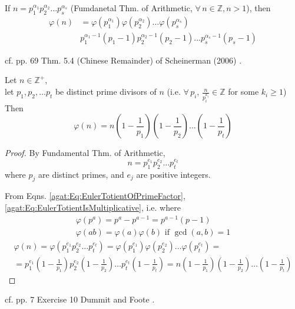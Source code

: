 If $n=p_1^{\alpha_1}p_2^{\alpha_2} \dots p_s^{\alpha_s}$ (Fumdanetal Thm. of Arithmetic, $\forall \, n \in \mathbb{Z}, n>1$), then 
\begin{equation}
\boxed{ 
	\begin{aligned}
	\varphi(n) & = \varphi(p_1^{\alpha_1})  \varphi(p_2^{\alpha_2}) \dots \varphi(p_s^{\alpha_s}) \\ 
	& p_1^{\alpha_1 - 1 } (p_1 - 1) p_2^{\alpha_2 - 1} (p_2 - 1 ) \dots p_s^{\alpha_s -1} (p_s - 1) 
	\end{aligned} }
\end{equation}


cf. pp. 69 Thm. 5.4 (Chinese Remainder) of Scheinerman (2006) \cite{agat:Sche2006}.  
\begin{theorem}
	Let $n\in \mathbb{Z}^+$, \\
	let $p_1,p_2, \dots p_t$ be distinct prime divisors of $n$ (i.e. $\forall \, p_i$, $\frac{n}{p_i^{k_i}} \in \mathbb{Z}$ for some $k_i \geq 1$) \\
	Then
	\begin{equation}
	\varphi(n) = n\left( 1 - \frac{1}{p_1} \right)\left( 1- \frac{1}{p_2} \right) \ldots \left( 1 - \frac{1}{p_t} \right) 	
	\end{equation}
\end{theorem}

\begin{proof}
	By Fundamental Thm. of Arithmetic, 
	\[
	n = p_1^{e_1} p_2^{e_2} \dots p_t^{e_t} 
	\]
	where $p_j$ are distinct primes, and $e_j$ are positive integers.  
	
	From Eqns. \ref{agat:Eq:EulerTotientOfPrimeFactor}, \ref{agat:Eq:EulerTotientIsMultiplicative}, i.e. where 
	\[
	\begin{gathered}
	\varphi(p^a) = p^a - p^{a-1} = p^{a-1} (p-1) \\
	\varphi(ab) = \varphi(a) \varphi(b)  \text{ if } \gcd(a,b) = 1
		\end{gathered}
		\]
		\[
		\begin{gathered}
	\varphi(n) = \varphi(p_1^{e_1}p_2^{e_2} \dots p_t^{e_t}) = \varphi(p_1^{e_1}) \varphi(p_2^{e_2}) \dots \varphi(p_t^{e_t}) = \\
	= p_1^{e_1} (1- \frac{1}{p_1} )p_2^{e_2} (1- \frac{1}{p_2} ) \dots p_t^{e_t} (1- \frac{1}{p_t} ) = n(1- \frac{1}{p_1}) (1- \frac{1}{p_2}) \dots (1- \frac{1}{p_t})
		\end{gathered}
		\]
	\end{proof}


cf. pp. 7 Exercise 10 Dummit and Foote \cite{agat:DuFo2003}.  

